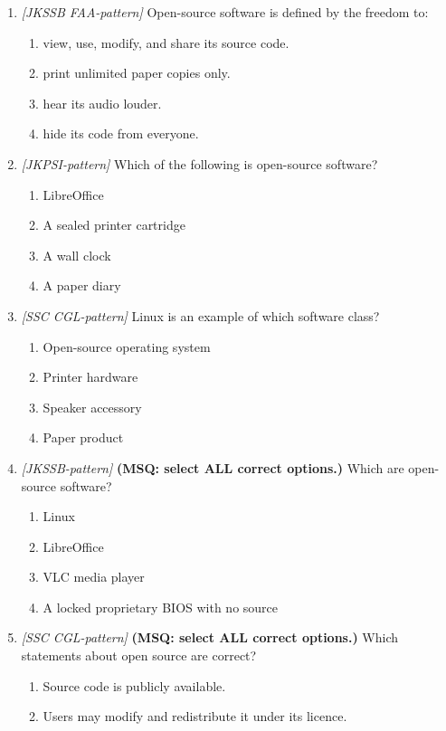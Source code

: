 \begin{enumerate}[label=\textbf{Q\arabic*.}, leftmargin=*]
\item \textit{[JKSSB FAA-pattern]} Open-source software is defined by the freedom to:
  \begin{enumerate}[label=\Alph*.]
    \item view, use, modify, and share its source code.
    \item print unlimited paper copies only.
    \item hear its audio louder.
    \item hide its code from everyone.
  \end{enumerate}
\item \textit{[JKPSI-pattern]} Which of the following is open-source software?
  \begin{enumerate}[label=\Alph*.]
    \item LibreOffice
    \item A sealed printer cartridge
    \item A wall clock
    \item A paper diary
  \end{enumerate}
\item \textit{[SSC CGL-pattern]} Linux is an example of which software class?
  \begin{enumerate}[label=\Alph*.]
    \item Open-source operating system
    \item Printer hardware
    \item Speaker accessory
    \item Paper product
  \end{enumerate}
\item \textit{[JKSSB-pattern]} \textbf{(MSQ: select ALL correct options.)} Which are open-source software?
  \begin{enumerate}[label=\Alph*.]
    \item Linux
    \item LibreOffice
    \item VLC media player
    \item A locked proprietary BIOS with no source
  \end{enumerate}
\item \textit{[SSC CGL-pattern]} \textbf{(MSQ: select ALL correct options.)} Which statements about open source are correct?
  \begin{enumerate}[label=\Alph*.]
    \item Source code is publicly available.
    \item Users may modify and redistribute it under its licence.

\end{enumerate}
\end{enumerate}
